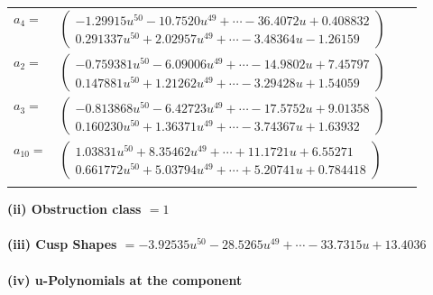 \documentclass[1p]{elsarticle_modified}
\theoremstyle{definition}
\begin{document}
\begin{tabular}{m{7pt} m{180pt} m{7pt} m{180pt} }
\flushright $a_{4}=$&$\begin{pmatrix}-1.29915 u^{50}-10.7520 u^{49}+\cdots-36.4072 u+0.408832\\0.291337 u^{50}+2.02957 u^{49}+\cdots-3.48364 u-1.26159\end{pmatrix}$ \\
\flushright $a_{2}=$&$\begin{pmatrix}-0.759381 u^{50}-6.09006 u^{49}+\cdots-14.9802 u+7.45797\\0.147881 u^{50}+1.21262 u^{49}+\cdots-3.29428 u+1.54059\end{pmatrix}$ \\
\flushright $a_{3}=$&$\begin{pmatrix}-0.813868 u^{50}-6.42723 u^{49}+\cdots-17.5752 u+9.01358\\0.160230 u^{50}+1.36371 u^{49}+\cdots-3.74367 u+1.63932\end{pmatrix}$ \\
\flushright $a_{10}=$&$\begin{pmatrix}1.03831 u^{50}+8.35462 u^{49}+\cdots+11.1721 u+6.55271\\0.661772 u^{50}+5.03794 u^{49}+\cdots+5.20741 u+0.784418\end{pmatrix}$\\&\end{tabular}
\flushleft \textbf{(ii) Obstruction class $= 1$}\\~\\
\flushleft \textbf{(iii) Cusp Shapes $= -3.92535 u^{50}-28.5265 u^{49}+\cdots-33.7315 u+13.4036$}\\~\\
\newpage\renewcommand{\arraystretch}{1}
\flushleft \textbf{(iv) u-Polynomials at the component}\newline \\
\end{document}
